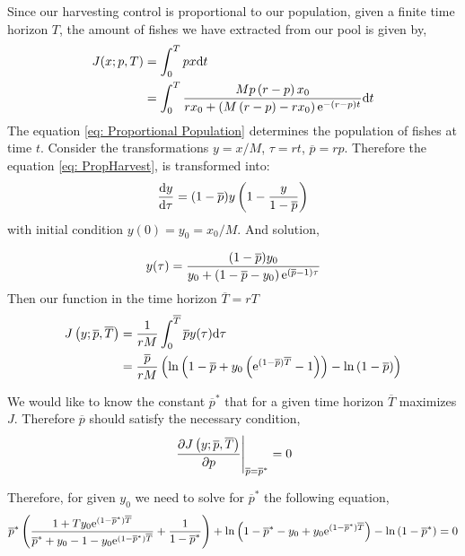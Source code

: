 Since our harvesting control is proportional to our population, given a finite time horizon $T$, the amount of fishes we have extracted from our pool is given by,
\begin{align}
	J(x;p,T)&=\int_{0}^{T} p x \mathrm{d} t \nonumber \\
			&=\int_{0}^{T} \frac{M p\left(r-p\right)x_0}{rx_0+\left(M\left(r-p\right)-rx_0\right)\mathrm{e}^{-(r-p) t}} \mathrm{d} t \nonumber
\end{align}
The equation \ref{eq: Proportional Population} determines the population of fishes at time $t$. Consider the transformations $y=x/M$, $\tau=rt$, $\overline{p}=rp$. Therefore the equation \ref{eq: PropHarvest}, is transformed into:
\begin{equation}
\frac{\mathrm{d} y}{{\mathrm{d} \tau}}=(1-\overline{p})y\left(1-\frac{y}{1-\overline{p}}\right)
\end{equation}
with initial condition $y(0)=y_0=x_0/M$. And solution,

\begin{equation}
	y(\tau)=\frac{(1-\overline p)y_0}{y_0+\left(1-\overline p-y_0\right)\mathrm{e}^{(\overline p-1)\tau}}
\end{equation}
Then our function in the time horizon $\overline{T}=rT$
\begin{align}
J\left(y;\overline{p},\overline{T}\right)&=\frac{1}{rM}\int_0^{\overline{T}}\overline{p}y(\tau)\mathrm{d} \tau	\\
&=\frac{\overline{p}}{rM}\left(\ln\left(1-\overline{p}+y_0\left(\mathrm{e}^{(1-\overline{p})\overline{T}}-1\right)\right)-\ln\left(1-\overline{p}\right)\right)
\end{align}

We would like to know the constant $\overline{p}^*$ that for a given time horizon $\overline{T}$ maximizes $J$. Therefore $\overline{p}$ should satisfy the necessary condition,
\begin{equation}
\left.\frac{\partial J\left(y;\overline{p},\overline{T}\right)}{{\partial p}}\right|_{\overline{p}=\overline{p}^*}=0
\end{equation}

Therefore, for given $y_0$ we need to solve for $\overline{p}^*$ the following equation,
\begin{equation}
\overline{p}^* \left(\frac{1+Ty_0\mathrm{e}^{\left(1-\overline{p}^*\right)\overline{T}}}{\overline{p}^*+y_0-1 -y_0\mathrm{e}^{(1-\overline{p}^*)\overline{T}}}+\frac{1}{1-\overline{p}^*}\right)+\ln
\left(1-\overline{p}^*-y_0 +y_0\mathrm{e}^{(1-\overline{p}^*)\overline{T}}\right)-\ln\left(1-\overline{p}^*\right)=0 \label{eq: Nonlinear equation}
\end{equation}

